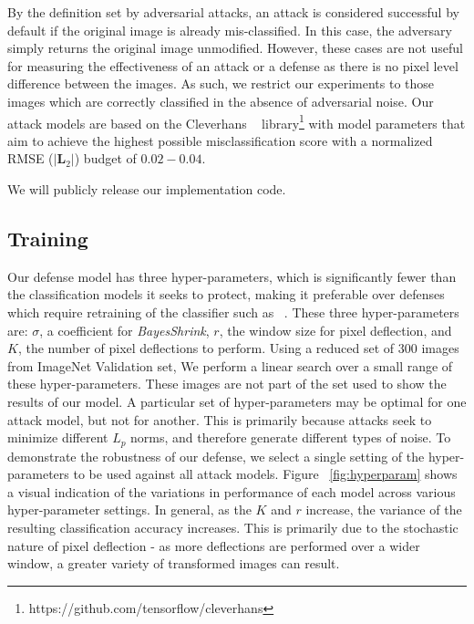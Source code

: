By the definition set by adversarial attacks, an attack is considered successful by default if the original image is already mis-classified. 
In this case, the adversary simply returns the original image unmodified. 
However, these cases are not useful for measuring the effectiveness of an attack or a defense as there is no pixel level difference between the images.
As such, we restrict our experiments to those images which are correctly classified in the absence of adversarial noise.
Our attack models are based on the Cleverhans  ~\cite{papernot2017cleverhans} library\footnote{https://github.com/tensorflow/cleverhans} with model parameters that aim to achieve the highest possible misclassification score with a normalized RMSE ($|\bm{L}_2|$) budget of $0.02-0.04$.

We will publicly release  our implementation code.

\subsection{Training}

Our defense model has three hyper-parameters, which is significantly fewer than the classification models it seeks to protect, making it preferable over defenses which require retraining of the classifier such as  ~\cite{Tramr2017TheSO,Meng2017MagNetAT}.
These three hyper-parameters are: $\sigma$, a coefficient for \textit{BayesShrink}, $r$, the window size for pixel deflection, and $K$, the number of pixel deflections to perform.
Using a reduced set of $300$ images from ImageNet Validation set, We perform a linear search over a small range of these hyper-parameters. 
These images are not part of the set used to show the results of our model.
A particular set of hyper-parameters may be optimal for one attack model, but not for another.  
This is primarily because attacks seek to minimize different $L_p$ norms, and therefore generate different types of noise.
To demonstrate the robustness of our defense, we select a single setting of the hyper-parameters to be used against all attack models.
Figure ~\ref{fig:hyperparam} shows a visual indication of the variations in performance of each model across various hyper-parameter settings. 
In general, as the $K$ and $r$ increase, the variance of the resulting classification accuracy increases.  
This is primarily due to the stochastic nature of pixel deflection - as more deflections are performed over a wider window, a greater variety of transformed images can result.

